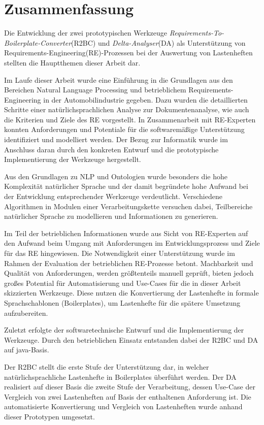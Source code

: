 \documentclass[12pt]{report}
\begin{document}
\section{Zusammenfassung}
Die Entwicklung der zwei prototypischen Werkzeuge \textit{Requirements-To-Boilerplate-Converter}(R2BC) und \textit{Delta-Analyser}(DA) als Unterstützung von Requirements-Engineering(RE)-Prozessen bei der Auswertung von Lastenheften stellten die Hauptthemen dieser Arbeit dar.

Im Laufe dieser Arbeit wurde eine Einführung in die Grundlagen aus den Bereichen Natural Language Processing und betrieblichem Requirements-Engineering in der Automobilindustrie gegeben. Dazu wurden die detaillierten Schritte einer natürlichsprachlichen Analyse zur Dokumentenanalyse, wie auch die Kriterien und Ziele des RE vorgestellt. In Zusammenarbeit mit RE-Experten konnten Anforderungen und Potentiale für die softwaremäßige Unterstützung identifiziert und modelliert werden. Der Bezug zur Informatik wurde im Anschluss daran durch den konkreten Entwurf und die prototypische Implementierung der Werkzeuge hergestellt. 

\vspace{12pt}
Aus den Grundlagen zu NLP und Ontologien wurde besonders die hohe Komplexität natürlicher Sprache und der damit begründete hohe Aufwand bei der Entwicklung entsprechender Werkzeuge verdeutlicht. Verschiedene Algorithmen in Modulen einer Verarbeitungskette versuchen dabei, Teilbereiche natürlicher Sprache zu modellieren und Informationen zu generieren. 

Im Teil der betrieblichen Informationen wurde aus Sicht von RE-Experten auf den Aufwand beim Umgang mit Anforderungen im Entwicklungsprozess und Ziele für das RE hingewiesen. Die Notwendigkeit einer Unterstützung wurde im Rahmen der Evaluation der betrieblichen RE-Prozesse betont. Machbarkeit und Qualität von Anforderungen, werden größtenteils manuell geprüft, bieten jedoch großes Potential für Automatisierung und Use-Cases für die in dieser Arbeit skizzierten Werkzeuge. Diese nutzen die Konvertierung der Lastenhefte in formale Sprachschablonen (Boilerplates), um Lastenhefte für die spätere Umsetzung aufzubereiten.

Zuletzt erfolgte der softwaretechnische Entwurf und die Implementierung der Werkzeuge. Durch den betrieblichen Einsatz entstanden dabei der R2BC und DA auf java-Basis.

Der R2BC stellt die erste Stufe der Unterstützung dar, in welcher natürlichsprachliche Lastenhefte in Boilerplates überführt werden. Der DA realisiert auf dieser Basis die zweite Stufe der Verarbeitung, dessen Use-Case der Vergleich von zwei Lastenheften auf Basis der enthaltenen Anforderung ist. Die automatisierte Konvertierung und Vergleich von Lastenheften wurde anhand dieser Prototypen umgesetzt. 
\end{document}
